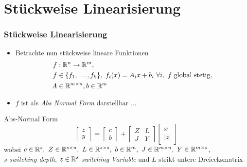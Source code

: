\section[Stückweise Linearisierung]{Stückweise Linearisierung}
\begin{frame}[<+->]
\frametitle{Stückweise Linearisierung}
\begin{itemize}
\item Betrachte nun stückweise lineare Funktionen 
\[
\begin{aligned}
 f&:\mathbb R^n \to \mathbb R^m, \\
 f&\in \lbrace f_1,\ldots,f_k\rbrace,~f_i(x)=A_ix+b_i~\forall i,~f\text{ global stetig}, \\
 A&\in\mathbb R^{m\times n},b\in\mathbb R^m
 \end{aligned}
\]
 \item $f$ ist als \textit{Abs Normal Form} darstellbar $\ldots$
 \end{itemize}
\begin{block}{Abs-Normal Form}
 \begin{equation}
\label{eq:absNormalForm}
  \begin{bmatrix}
   z\\y
  \end{bmatrix}
  =
  \begin{bmatrix}
   c\\b
  \end{bmatrix}
  +
  \begin{bmatrix}
   Z & L\\
   J & Y
  \end{bmatrix}
  \begin{bmatrix}
   x\\|z|
  \end{bmatrix}
 \end{equation}
wobei $c\in \mathbb R^s, ~ Z\in \mathbb R^{s\times n},~ L\in\mathbb R^{s\times s}, ~ b\in\mathbb R^m, ~ J\in\mathbb R^{m\times n}, ~ Y\in \mathbb R^{m\times s}$,\\
$s$ \textit{switching depth}, $z\in \mathbb R^s$ \textit{switching Variable} und $L$ strikt untere Dreiecksmatrix
\end{block}
\end{frame}

